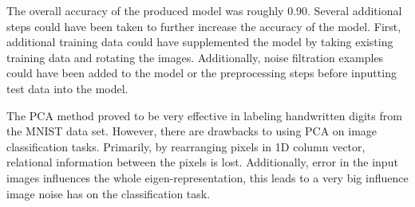 \documentclass[12pt]{article}
\begin{document}
\bigbreak
\noindent
The overall accuracy of the produced model was roughly 0.90. Several additional steps could have been taken to further increase the accuracy of the model. First, additional training data could have supplemented the model by taking existing training data and rotating the images. Additionally, noise filtration examples could have been added to the model or the preprocessing steps before inputting test data into the model. 

\bigbreak
\noindent
The PCA method proved to be very effective in labeling handwritten digits from the MNIST data set. However, there are drawbacks to using PCA on image classification tasks. Primarily, by rearranging pixels in 1D column vector, relational information between the pixels is lost. Additionally, error in the input images influences the whole eigen-representation, this leads to a very big influence image noise has on the classification task.  
\end{document}
